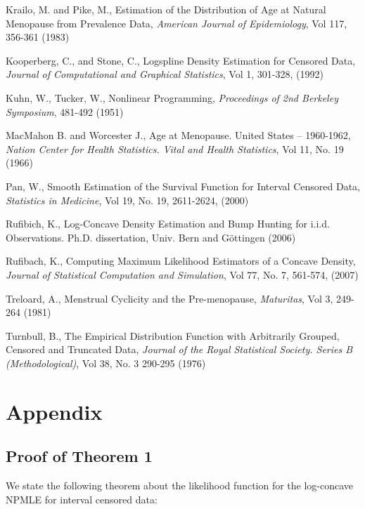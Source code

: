 \begin{thebibliography}{}
Krailo, M. and Pike, M., Estimation of the Distribution of Age at Natural Menopause from Prevalence Data, \emph{American Journal of Epidemiology}, Vol 117, 356-361 (1983)



Kooperberg, C., and Stone, C., Logspline Density Estimation for Censored Data, \emph{Journal of Computational and Graphical Statistics}, Vol 1, 301-328, (1992)

Kuhn, W., Tucker, W., Nonlinear Programming, \emph{Proceedings of 2nd Berkeley Symposium}, 481-492 (1951)

MacMahon B. and Worcester J., Age at Menopause. United States -- 1960-1962, \emph{Nation Center for Health Statistics. Vital and Health Statistics}, Vol 11, No. 19 (1966)


Pan, W., Smooth Estimation of the Survival Function for Interval Censored Data, \emph{Statistics in Medicine}, Vol 19, No. 19, 2611-2624,  (2000)

Rufibich, K., Log-Concave Density Estimation and Bump Hunting for i.i.d. Observations. Ph.D. dissertation, Univ. Bern and G\"ottingen (2006)


Rufibach, K., Computing Maximum Likelihood Estimators of a Concave Density, \emph{Journal of Statistical Computation and Simulation}, Vol 77, No. 7, 561-574, (2007)

Treloard, A., Menstrual Cyclicity and the Pre-menopause, \emph{Maturitas}, Vol 3, 249-264 (1981)


Turnbull, B., The Empirical Distribution Function with Arbitrarily Grouped, Censored and Truncated Data, \emph{Journal of the Royal Statistical Society. Series B (Methodological)}, Vol 38, No. 3 290-295 (1976)


\end{thebibliography}




{\section{Appendix} } 	
\label{sec:10}
	\subsection{Proof of Theorem 1}
	
	We state the following theorem about the likelihood function for the log-concave NPMLE for interval censored data:
		
